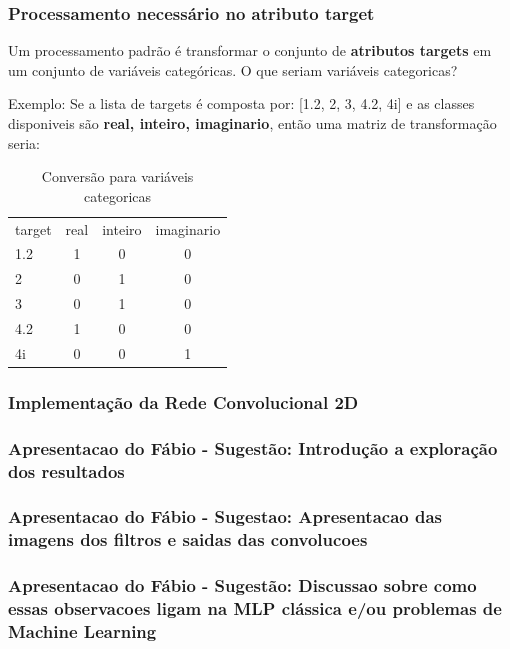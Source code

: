 \documentclass[11pt]{beamer}
\begin{document}
    \begin{frame}
      \frametitle{Processamento necessário no atributo target}

      Um processamento padrão é transformar o conjunto de
      \textbf{atributos targets} em um conjunto de variáveis
      categóricas. O que seriam variáveis categoricas?

      Exemplo: Se a lista de targets é composta por: [1.2, 2, 3, 4.2,
      4i] e as classes disponiveis são \textbf{real, inteiro,
        imaginario}, então uma matriz de transformação seria:
      
      \begin{table}[h]
        \caption{Conversão para variáveis categoricas}
        \begin{tabular}{l|c|c|c|}
          
          target & real & inteiro & imaginario \\
          1.2    & 1    & 0       & 0 \\
          2      & 0    & 1       & 0 \\
          3      & 0    & 1       & 0 \\
          4.2    & 1    & 0       & 0 \\
          4i     & 0    & 0       & 1
                                    
        \end{tabular}
      \end{table}
    \end{frame}

    \begin{frame}
      \frametitle{Implementação da Rede Convolucional 2D}
      
    \end{frame}
    

    \begin{frame}
      \frametitle{Apresentacao do Fábio - Sugestão: Introdução a exploração dos resultados}
    \end{frame}

    \begin{frame}
      \frametitle{Apresentacao do Fábio - Sugestao: Apresentacao das
        imagens dos filtros e saidas das convolucoes}
    \end{frame}

    \begin{frame}
      \frametitle{Apresentacao do Fábio - Sugestão: Discussao sobre
        como essas observacoes ligam na MLP clássica e/ou problemas de
        Machine Learning}
    \end{frame}
    
\end{document}
